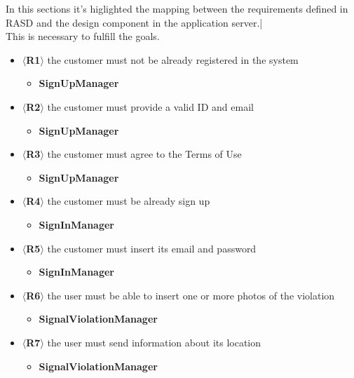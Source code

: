 In this sections it's higlighted the mapping between the requirements defined in
RASD and the design component in the application server.|\\ This is necessary to
fulfill the goals.
\begin{itemize}
    \item $\langle$\textbf{R1}$\rangle$ the customer must not be already
    registered  in the system   
    \begin{itemize}
        \item \textbf{SignUpManager}
    \end{itemize}   
    \item $\langle$\textbf{R2}$\rangle$ the customer must provide a valid ID and
    email
    \begin{itemize}
        \item \textbf{SignUpManager}
    \end{itemize}  
    \item $\langle$\textbf{R3}$\rangle$ the customer must agree to the Terms of
    Use
    \begin{itemize}
        \item \textbf{SignUpManager}
    \end{itemize}  
    \item $\langle$\textbf{R4}$\rangle$ the customer must be already sign up
    \begin{itemize}
        \item \textbf{SignInManager}
    \end{itemize}  
    \item $\langle$\textbf{R5}$\rangle$ the customer must insert its email and
    password
    \begin{itemize}
        \item \textbf{SignInManager}
    \end{itemize}  
    \item $\langle$\textbf{R6}$\rangle$ the user must be able to insert one or
    more photos of the violation
    \begin{itemize}
        \item \textbf{SignalViolationManager}
    \end{itemize}  
    \item $\langle$\textbf{R7}$\rangle$ the user must send information about its
    location
    \begin{itemize}
        \item \textbf{SignalViolationManager}

\end{itemize}
\end{itemize}
